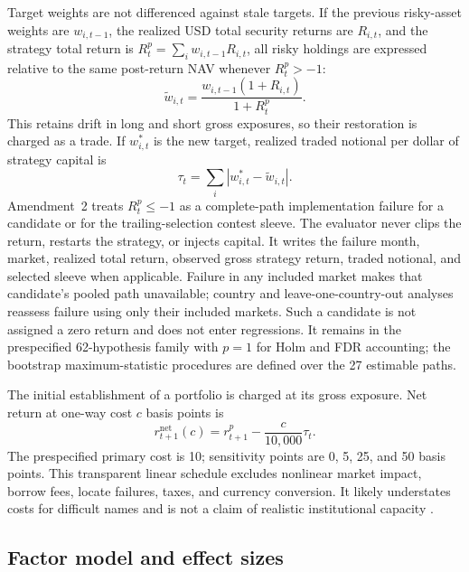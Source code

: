\documentclass[11pt]{article}
\newcommand{\bps}[1]{\SI{#1}{\text{bp}}}
\begin{document}
Target weights are not differenced against stale targets. If the previous risky-asset weights are $w_{i,t-1}$, the realized USD total security returns are $R_{i,t}$, and the strategy total return is $R^p_t=\sum_iw_{i,t-1}R_{i,t}$, all risky holdings are expressed relative to the same post-return NAV whenever $R^p_t>-1$:
\begin{equation}
  \widetilde w_{i,t}=\frac{w_{i,t-1}(1+R_{i,t})}{1+R^p_t}.
\end{equation}
This retains drift in long and short gross exposures, so their restoration is charged as a trade. If $w_{i,t}^{*}$ is the new target, realized traded notional per dollar of strategy capital is
\begin{equation}
  \tau_t = \sum_i \left|w_{i,t}^{*}-\widetilde w_{i,t}\right|.
\end{equation}
Amendment~2 treats $R^p_t\leq -1$ as a complete-path implementation failure for a candidate or for the trailing-selection contest sleeve. The evaluator never clips the return, restarts the strategy, or injects capital. It writes the failure month, market, realized total return, observed gross strategy return, traded notional, and selected sleeve when applicable. Failure in any included market makes that candidate's pooled path unavailable; country and leave-one-country-out analyses reassess failure using only their included markets. Such a candidate is not assigned a zero return and does not enter regressions. It remains in the prespecified 62-hypothesis family with $p=1$ for Holm and FDR accounting; the bootstrap maximum-statistic procedures are defined over the 27 estimable paths.

The initial establishment of a portfolio is charged at its gross exposure. Net return at one-way cost $c$ basis points is
\begin{equation}
  r^{\mathrm{net}}_{t+1}(c)=r^{p}_{t+1}-\frac{c}{10{,}000}\tau_t.
\end{equation}
The prespecified primary cost is \bps{10}; sensitivity points are 0, 5, 25, and 50 basis points. This transparent linear schedule excludes nonlinear market impact, borrow fees, locate failures, taxes, and currency conversion. It likely understates costs for difficult names and is not a claim of realistic institutional capacity \citep{NovyMarxVelikov2016}.

\subsection{Factor model and effect sizes}
\end{document}
